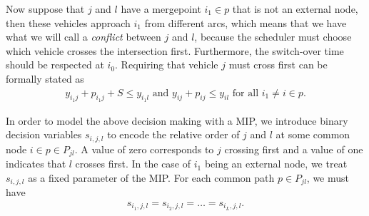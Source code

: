 \documentclass{article}
\theoremstyle{definition}
\theoremstyle{plain}
\begin{document}
Now suppose that $j$ and $l$ have a mergepoint $i_{1} \in p$ that is not an
external node, then these vehicles approach $i_{1}$ from different arcs,
which means that we have what we will call a \textit{conflict} between $j$ and
$l$, because the scheduler must choose which vehicle crosses the intersection
first. Furthermore, the switch-over time should be respected at $i_{0}$.
Requiring that vehicle $j$ must cross first can be formally stated as
\begin{align*}
  y_{i_{1}j} + p_{i_{1}j} + S \leq y_{i_{1}l} \text{ and } y_{ij} + p_{ij} \leq y_{il} \text{ for all } i_{1} \neq i \in p .
\end{align*}

In order to model the above decision making with a MIP, we introduce binary
decision variables $s_{i,j,l}$ to encode the relative order of $j$ and $l$ at some common
node $i \in p \in P_{jl}$. A value of zero corresponds to $j$ crossing first and
a value of one indicates that $l$ crosses first.
In the case of $i_{1}$ being an external node, we treat $s_{i,j,l}$ as a fixed
parameter of the MIP.
For each common path $p \in P_{jl}$, we must have
\begin{align*}
s_{i_{1},j,l} = s_{i_{2},j,l} = \dots = s_{i_{L},j,l}.
\end{align*}
\end{document}
